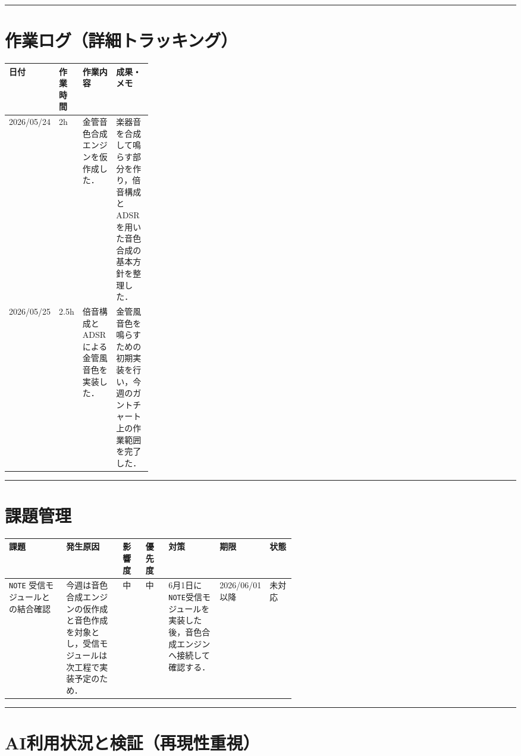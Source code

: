 \documentclass[uplatex,dvipdfmx,a4paper,11pt]{jsarticle}
\newcommand{\sectionrule}{\par\medskip\noindent\rule{\linewidth}{0.6pt}\par\medskip}
\begin{document}
\sectionrule

\section{作業ログ（詳細トラッキング）}

\begin{tabularx}{\linewidth}{@{}p{0.16\linewidth}p{0.12\linewidth}XX@{}}
\toprule
日付 & 作業時間 & 作業内容 & 成果・メモ \\
\midrule
2026/05/24 & 2h & 金管音色合成エンジンを仮作成した． & 楽器音を合成して鳴らす部分を作り，倍音構成とADSRを用いた音色合成の基本方針を整理した． \\
2026/05/25 & 2.5h & 倍音構成とADSRによる金管風音色を実装した． & 金管風音色を鳴らすための初期実装を行い，今週のガントチャート上の作業範囲を完了した． \\
\bottomrule
\end{tabularx}

\sectionrule

\section{課題管理}

\begin{tabularx}{\linewidth}{@{}p{0.20\linewidth}Xp{0.08\linewidth}p{0.08\linewidth}Xp{0.11\linewidth}p{0.09\linewidth}@{}}
\toprule
課題 & 発生原因 & 影響度 & 優先度 & 対策 & 期限 & 状態 \\
\midrule
\texttt{NOTE} 受信モジュールとの結合確認 & 今週は音色合成エンジンの仮作成と音色作成を対象とし，受信モジュールは次工程で実装予定のため． & 中 & 中 & 6月1日に\texttt{NOTE}受信モジュールを実装した後，音色合成エンジンへ接続して確認する． & 2026/06/01以降 & 未対応 \\
\bottomrule
\end{tabularx}

\sectionrule

\section{AI利用状況と検証（再現性重視）}
\end{document}
